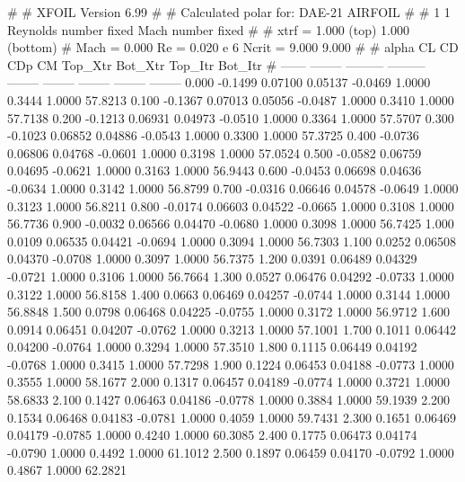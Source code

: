 #  
#       XFOIL         Version 6.99
#  
# Calculated polar for: DAE-21 AIRFOIL                                  
#  
# 1 1 Reynolds number fixed          Mach number fixed         
#  
# xtrf =   1.000 (top)        1.000 (bottom)  
# Mach =   0.000     Re =     0.020 e 6     Ncrit =   9.000  9.000
#  
#   alpha    CL        CD       CDp       CM     Top_Xtr  Bot_Xtr  Top_Itr  Bot_Itr
#  ------ -------- --------- --------- -------- -------- -------- -------- --------
   0.000  -0.1499   0.07100   0.05137  -0.0469   1.0000   0.3444   1.0000  57.8213
   0.100  -0.1367   0.07013   0.05056  -0.0487   1.0000   0.3410   1.0000  57.7138
   0.200  -0.1213   0.06931   0.04973  -0.0510   1.0000   0.3364   1.0000  57.5707
   0.300  -0.1023   0.06852   0.04886  -0.0543   1.0000   0.3300   1.0000  57.3725
   0.400  -0.0736   0.06806   0.04768  -0.0601   1.0000   0.3198   1.0000  57.0524
   0.500  -0.0582   0.06759   0.04695  -0.0621   1.0000   0.3163   1.0000  56.9443
   0.600  -0.0453   0.06698   0.04636  -0.0634   1.0000   0.3142   1.0000  56.8799
   0.700  -0.0316   0.06646   0.04578  -0.0649   1.0000   0.3123   1.0000  56.8211
   0.800  -0.0174   0.06603   0.04522  -0.0665   1.0000   0.3108   1.0000  56.7736
   0.900  -0.0032   0.06566   0.04470  -0.0680   1.0000   0.3098   1.0000  56.7425
   1.000   0.0109   0.06535   0.04421  -0.0694   1.0000   0.3094   1.0000  56.7303
   1.100   0.0252   0.06508   0.04370  -0.0708   1.0000   0.3097   1.0000  56.7375
   1.200   0.0391   0.06489   0.04329  -0.0721   1.0000   0.3106   1.0000  56.7664
   1.300   0.0527   0.06476   0.04292  -0.0733   1.0000   0.3122   1.0000  56.8158
   1.400   0.0663   0.06469   0.04257  -0.0744   1.0000   0.3144   1.0000  56.8848
   1.500   0.0798   0.06468   0.04225  -0.0755   1.0000   0.3172   1.0000  56.9712
   1.600   0.0914   0.06451   0.04207  -0.0762   1.0000   0.3213   1.0000  57.1001
   1.700   0.1011   0.06442   0.04200  -0.0764   1.0000   0.3294   1.0000  57.3510
   1.800   0.1115   0.06449   0.04192  -0.0768   1.0000   0.3415   1.0000  57.7298
   1.900   0.1224   0.06453   0.04188  -0.0773   1.0000   0.3555   1.0000  58.1677
   2.000   0.1317   0.06457   0.04189  -0.0774   1.0000   0.3721   1.0000  58.6833
   2.100   0.1427   0.06463   0.04186  -0.0778   1.0000   0.3884   1.0000  59.1939
   2.200   0.1534   0.06468   0.04183  -0.0781   1.0000   0.4059   1.0000  59.7431
   2.300   0.1651   0.06469   0.04179  -0.0785   1.0000   0.4240   1.0000  60.3085
   2.400   0.1775   0.06473   0.04174  -0.0790   1.0000   0.4492   1.0000  61.1012
   2.500   0.1897   0.06459   0.04170  -0.0792   1.0000   0.4867   1.0000  62.2821
